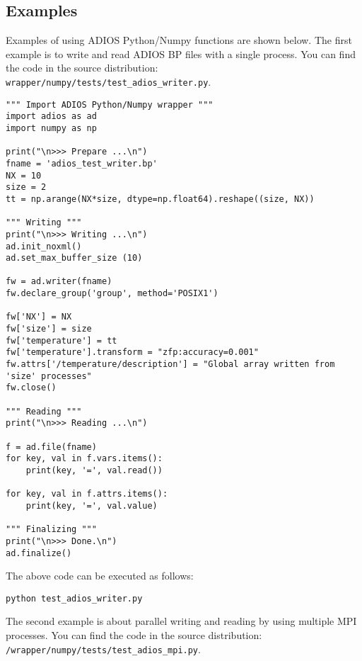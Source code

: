 \subsection{Examples}
Examples of using ADIOS Python/Numpy functions are shown below. The first example is to write and read ADIOS BP files with a single process. You can find the code in the source distribution: \\
\verb+wrapper/numpy/tests/test_adios_writer.py+.

\begin{lstlisting}[language=ADIOS-python,caption={A Python/Numpy example for writing/reading ADIOS BP file},label={},]
""" Import ADIOS Python/Numpy wrapper """
import adios as ad
import numpy as np

print("\n>>> Prepare ...\n")
fname = 'adios_test_writer.bp'
NX = 10
size = 2
tt = np.arange(NX*size, dtype=np.float64).reshape((size, NX))

""" Writing """
print("\n>>> Writing ...\n")
ad.init_noxml()
ad.set_max_buffer_size (10)

fw = ad.writer(fname)
fw.declare_group('group', method='POSIX1')

fw['NX'] = NX
fw['size'] = size
fw['temperature'] = tt
fw['temperature'].transform = "zfp:accuracy=0.001"
fw.attrs['/temperature/description'] = "Global array written from 'size' processes"
fw.close()

""" Reading """
print("\n>>> Reading ...\n")

f = ad.file(fname)
for key, val in f.vars.items():
    print(key, '=', val.read())

for key, val in f.attrs.items():
    print(key, '=', val.value)

""" Finalizing """
print("\n>>> Done.\n")
ad.finalize()
\end{lstlisting}

The above code can be executed as follows:
\begin{lstlisting}
python test_adios_writer.py
\end{lstlisting}

The second example is about parallel writing and reading by using multiple MPI processes. You can find the code in the source distribution: \verb+/wrapper/numpy/tests/test_adios_mpi.py+.

